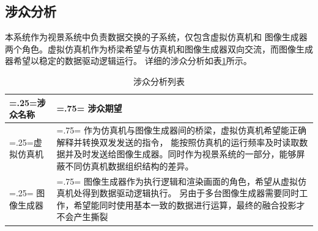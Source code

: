 \subsection{涉众分析}
本系统作为视景系统中负责数据交换的子系统，仅包含虚拟仿真机和
图像生成器两个角色。虚拟仿真机作为桥梁希望与仿真机和图像生成器双向交流，而图像生成器希望以稳定的数据驱动逻辑运行。
详细的涉众分析如表\ref{stakeholder}所示。
\begin{table}[h!]
    \begin{center}
        \caption{涉众分析列表}
        \label{stakeholder}
        \renewcommand\arraystretch{1.5}
        \begin{tabularx}{\textwidth}{ 
            | >{\centering\arraybackslash\hsize=.25\hsize\linewidth=\hsize}X 
            | >{\raggedright\arraybackslash\hsize=.75\hsize\linewidth=\hsize}X 
            | }
            \hline
            \textbf{涉众名称} & \textbf{涉众期望}\\
            \hline
            虚拟仿真机 &  作为仿真机与图像生成器间的桥梁，虚拟仿真机希望能正确解释并转换双发发送的指令，
                         能按照仿真机的运行频率及时读取数据并及时发送给图像生成器。同时作为视景系统的一部分，能够屏蔽不同仿真机数据组织结构的差异。\\
            \hline
            图像生成器 &  图像生成器作为执行逻辑和渲染画面的角色，希望从虚拟仿真机处得到数据驱动逻辑执行。
                          另由于多台图像生成器需要同时工作，希望能同时使用基本一致的数据进行运算，最终的融合投影才不会产生撕裂\\
            \hline
        \end{tabularx}
    \end{center}
\end{table}
